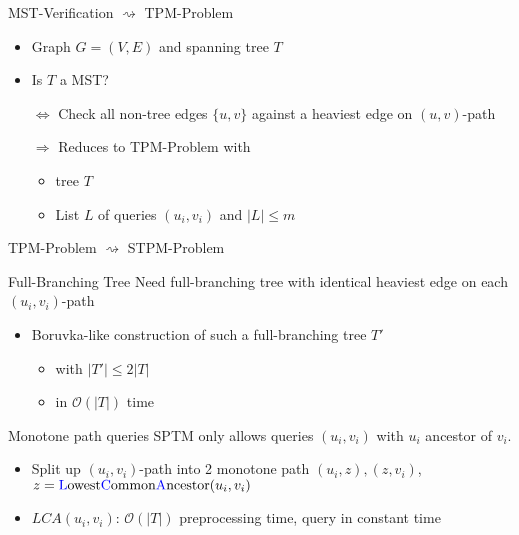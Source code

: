 \documentclass[18pt]{beamer}
\begin{document}
\begin{frame}{MST-Verification $	\rightsquigarrow$ TPM-Problem}
	\begin{itemize}
		\item Graph $G=(V,E)$ and spanning tree $T$
		\item Is $T$ a MST? 
		\item [$\Leftrightarrow$] Check all non-tree edges $\{u,v\}$ against a heaviest edge on $(u,v)$-path
		
		\bigskip
		\pause
		\item [$\Rightarrow$] Reduces to TPM-Problem with 
		\begin{itemize}
			\item tree $T$
			\item List $L$ of queries $(u_i,v_i)$ and $|L| \le m$
		\end{itemize}
	\end{itemize}
\end{frame}
\begin{frame}{TPM-Problem $	\rightsquigarrow$ STPM-Problem}
	\begin{block}{Full-Branching Tree}
		Need {\color{blue} full-branching tree} with identical heaviest edge on each $(u_i,v_i)$-path
	\end{block}
	\begin{itemize}
		\item Boruvka-like construction of such a full-branching tree $T'$
		\begin{itemize}
			\item with $|T'| \le 2|T|$
			\item in $\mathcal{O}(|T|)$ time
		\end{itemize}
	\end{itemize}
	\bigskip
	\pause
	\begin{block}{Monotone path queries}
		SPTM only allows queries $(u_i,v_i)$ with $u_i$ ancestor of $v_i$.
	\end{block}
	\begin{itemize}
	\item Split up $(u_i,v_i)$-path into 2 monotone path $(u_i,z), (z, v_i)$,  \\ $z = \textup{{\color{blue}L}owest{\color{blue}C}ommon{\color{blue}A}ncestor}(u_i,v_i)$
	\item $LCA(u_i,v_i)$: $\mathcal{O}(|T|)$ preprocessing time, query in constant time
	\end{itemize}
\end{frame}
\end{document}
